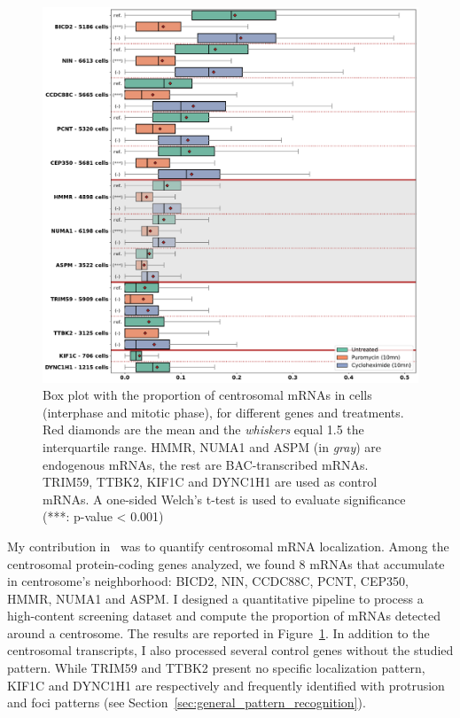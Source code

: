 \begin{figure}[]
    \centering
    \includegraphics[width=\textwidth]{figures/chapter5/plot_rna_centrosome}
    \caption[Box plot with the proportion of centrosomal mRNAs]{Box plot with the proportion of centrosomal mRNAs in cells (interphase and mitotic phase), for different genes and treatments.
	Red diamonds are the mean and the \textit{whiskers} equal 1.5 the interquartile range.
	HMMR, NUMA1 and ASPM (in \textit{gray}) are endogenous mRNAs, the rest are BAC-transcribed mRNAs.
	TRIM59, TTBK2, KIF1C and DYNC1H1 are used as control mRNAs.
	A one-sided Welch’s t-test is used to evaluate significance (***: p-value < 0.001)}
    \label{fig:plot_rna_centrosome}
\end{figure}

My contribution in~\cite{safieddine_choreography_2021} was to quantify centrosomal \ac{mRNA} localization.
Among the centrosomal protein-coding genes analyzed, we found 8 \ac{mRNA}s that accumulate in centrosome's neighborhood: BICD2, NIN, CCDC88C, PCNT, CEP350, HMMR, NUMA1 and ASPM.
I designed a quantitative pipeline to process a high-content screening dataset and compute the proportion of \ac{mRNA}s detected around a centrosome.
The results are reported in Figure~\ref{fig:plot_rna_centrosome}.
In addition to the centrosomal transcripts, I also processed several control genes without the studied pattern.
While TRIM59 and TTBK2 present no specific localization pattern, KIF1C and DYNC1H1 are respectively and frequently identified with protrusion and foci patterns (see Section~\ref{sec:general_pattern_recognition}).

